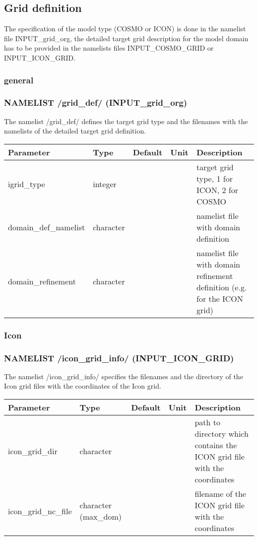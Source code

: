 \documentclass[a4paper,10pt,DIV14,BCOR1cm,titlepage,twoside]{scrartcl}
\providecommand{\tabularnewline}{\\}
\begin{document}
\subsection{Grid definition}\label{namelist_input_for_extpar_grid_def}
The specification of the model type (COSMO or ICON) is done in the namelist file INPUT\_grid\_org, the detailed target grid description for the model domain has to be provided in the namelists files INPUT\_COSMO\_GRID or INPUT\_ICON\_GRID.
\label{namelist_target}
\subsubsection{general}\label{namelist_input_for_extpar_grid_def_general}
\subsubsection*{NAMELIST /grid\_def/ (INPUT\_grid\_org)}
The namelist  /grid\_def/ defines the target grid type and the filenames with the namelists of the detailed target grid definition.

\begin{longtable}{|p{4.2cm}|p{1.5cm}|p{1.5cm}|p{0.8cm}|p{6cm}|}
\hline 
\textbf{Parameter}&\textbf{Type}&\textbf{Default}&\textbf{Unit}&\textbf{Description}\tabularnewline
\hline
\endhead
\hline 
igrid\_type& integer& & & target grid type, 1 for ICON, 2 for COSMO 
 \tabularnewline
\hline 
domain\_def\_namelist & character& & & namelist file with domain definition 
 \tabularnewline
\hline
domain\_refinement & character& & & namelist file with domain refinement definition (e.g. for the ICON grid)
 \tabularnewline
\hline
\end{longtable}

\subsubsection{Icon}\label{namelist_input_for_extpar_grid_def_icon}

\subsubsection*{NAMELIST /icon\_grid\_info/ (INPUT\_ICON\_GRID) }
The namelist /icon\_grid\_info/ specifies the filenames and the directory of the Icon grid files with the coordinates of the Icon grid.

\begin{longtable}{|p{4cm}|p{1.5cm}|p{1.5cm}|p{1cm}|p{6cm}|}
\hline 
\textbf{Parameter}& \textbf{Type}& \textbf{Default}& \textbf{Unit}& \textbf{Description}
\tabularnewline
\hline
\endhead
\hline 
icon\_grid\_dir & character & &  & path to directory which contains the ICON grid file with the coordinates \tabularnewline
\hline 
icon\_grid\_nc\_file & character (max\_dom) & & & filename of the ICON grid file with the coordinates\tabularnewline
\hline 
\bottomrule
\end{longtable}
\end{document}
